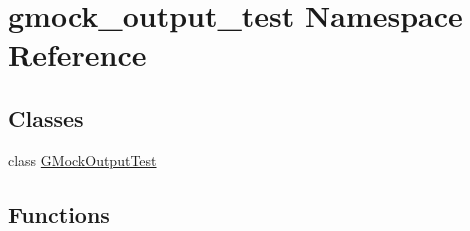 \hypertarget{namespacegmock__output__test}{}\section{gmock\+\_\+output\+\_\+test Namespace Reference}
\label{namespacegmock__output__test}
\subsection*{Classes}
\begin{DoxyCompactItemize}
\item 
class \mbox{\hyperlink{classgmock__output__test_1_1GMockOutputTest}{G\+Mock\+Output\+Test}}
\end{DoxyCompactItemize}
\subsection*{Functions}
